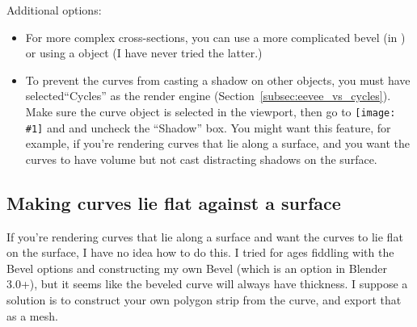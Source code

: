 \documentclass[10pt]{article}
\newcommand{\obj}[1]{\menu{\color{magenta} #1}}
\DeclareRobustCommand{\inlinepic}[1]{%
  \begingroup\normalfont
  \texttt{[image: \#1]}%
  \endgroup
}
\begin{document}
Additional options:
\begin{itemize}
    \item For more complex cross-sections, you can use a more complicated bevel (in ) or using a \obj{Bevel} object (I have never tried the latter.)
    \item To prevent the curves from casting a shadow on other objects, you must have selected``Cycles'' as the render engine (Section~\ref{subsec:eevee_vs_cycles}). Make sure the curve object is selected in the viewport, then go to  \inlinepic{images/object-properties-icon.png} and  and uncheck the ``Shadow'' box. You might want this feature, for example, if you're rendering curves that lie along a surface, and you want the curves to have volume but not cast distracting shadows on the surface.
\end{itemize}



\subsection{Making curves lie flat against a surface}
If you're rendering curves that lie along a surface and want the curves to lie flat on the surface, I have no idea how to do this. I tried for ages fiddling with the Bevel options and constructing my own Bevel (which is an option in Blender 3.0+), but it seems like the beveled curve will always have thickness. I suppose a solution is to construct your own polygon strip from the curve, and export that as a mesh.
\end{document}
